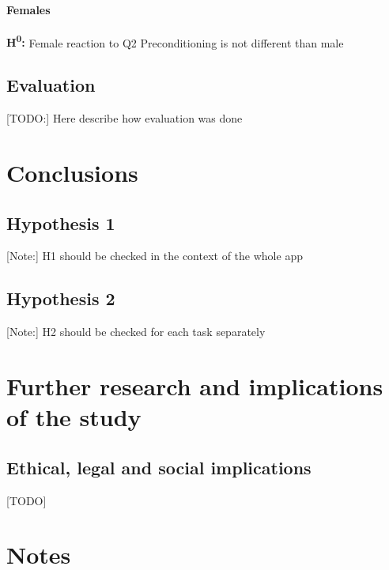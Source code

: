 	\paragraph{Females} 
	\textbf{H\textsuperscript{0}:} Female reaction to Q2 Preconditioning is not different than male
	
	\subsection{Evaluation}
	
	[TODO:] Here describe how evaluation was done
	
\section{Conclusions}

	\subsection{Hypothesis 1}
	
	[Note:] H1 should be checked in the context of the whole app
	
	\subsection{Hypothesis 2}
	
	[Note:] H2 should be checked for each task separately

\section{Further research and implications of the study} \label{sec:further-research}

\subsection{Ethical, legal and social implications}

[TODO]

\section{Notes}




